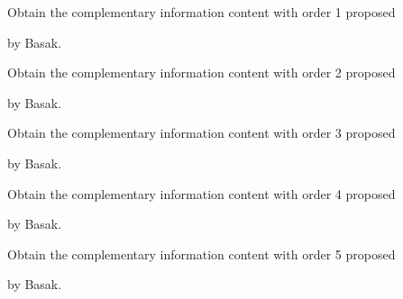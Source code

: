 \documentclass[letterpaper,10pt,english]{sphinxmanual}
\begin{document}

\begin{fulllineitems}
\label{reference/basak:basak.CalculateBasakCIC1}
Obtain the complementary information content with order 1 proposed

by Basak.

\end{fulllineitems}


\begin{fulllineitems}
\label{reference/basak:basak.CalculateBasakCIC2}
Obtain the complementary information content with order 2 proposed

by Basak.

\end{fulllineitems}


\begin{fulllineitems}
\label{reference/basak:basak.CalculateBasakCIC3}
Obtain the complementary information content with order 3 proposed

by Basak.

\end{fulllineitems}


\begin{fulllineitems}
\label{reference/basak:basak.CalculateBasakCIC4}
Obtain the complementary information content with order 4 proposed

by Basak.

\end{fulllineitems}


\begin{fulllineitems}
\label{reference/basak:basak.CalculateBasakCIC5}
Obtain the complementary information content with order 5 proposed

by Basak.

\end{fulllineitems}
\end{document}
